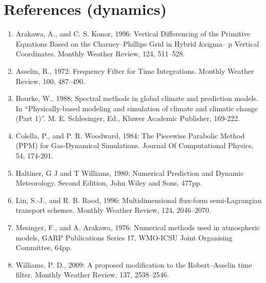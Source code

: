 \hypertarget{references-dynamics}{%
\section{References (dynamics)}\label{references-dynamics}}

\begin{enumerate}
\def\labelenumi{\arabic{enumi}.}
\item
  Arakawa, A., and C. S. Konor, 1996: Vertical Differencing of the
  Primitive Equations Based on the Charney--Phillips Grid in Hybrid
  \&sigma-- p Vertical Coordinates. Monthly Weather Review, 124,
  511--528.
\item
  Asselin, R., 1972: Frequency Filter for Time Integrations. Monthly
  Weather Review, 100, 487--490.
\item
  Bourke, W., 1988: Spectral methods in global climate and prediction
  models. In ``Physically-based modeling and simulation of climate and
  climatic change (Part 1)''. M. E. Schlesinger, Ed., Kluwer Academic
  Publisher, 169-222.
\item
  Colella, P., and P. R. Woodward, 1984: The Piecewise Parabolic Method
  (PPM) for Gas-Dynamical Simulations. Journal Of Computational Physics,
  54, 174-201.
\item
  Haltiner, G J and T Williams, 1980: Numerical Prediction and Dynamic
  Meteorology. Second Edition, John Wiley and Sons, 477pp.
\item
  Lin, S.-J., and R. B. Rood, 1996: Multidimensional flux-form
  semi-Lagrangian transport schemes. Monthly Weather Review, 124,
  2046--2070.
\item
  Mesinger, F., and A. Arakawa, 1976: Numerical methods used in
  atmospheric models, GARP Publications Series 17, WMO-ICSU Joint
  Organising Committee, 64pp.
\item
  Williams, P. D., 2009: A proposed modification to the Robert--Asselin
  time filter. Monthly Weather Review, 137, 2538--2546.
\end{enumerate}

